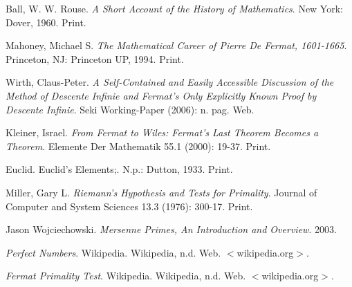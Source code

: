 \documentclass[11pt]{article}
\begin{document}
\begin{thebibliography}{9}
    Ball, W. W. Rouse. \emph{A Short Account of the History of Mathematics}. New York: Dover, 1960. Print.

    Mahoney, Michael S. \emph{The Mathematical Career of Pierre De Fermat, 1601-1665}. Princeton, NJ: Princeton UP, 1994. Print.

    Wirth, Claus-Peter.
    \emph{A Self-Contained and Easily Accessible Discussion of the Method of Descente Infinie and Fermat's Only Explicitly Known Proof by Descente Infinie}.
    Seki Working-Paper (2006): n. pag. Web.

    Kleiner, Israel.
    \emph{From Fermat to Wiles: Fermat's Last Theorem Becomes a Theorem}.
    Elemente Der Mathematik 55.1 (2000): 19-37. Print.

    Euclid. Euclid's Elements;. N.p.: Dutton, 1933. Print.

    Miller, Gary L.
    \emph{Riemann's Hypothesis and Tests for Primality}.
    Journal of Computer and System Sciences 13.3 (1976): 300-17. Print.

    Jason Wojciechowski.
    \emph{Mersenne Primes, An Introduction and Overview}. 2003.


    \emph{Perfect Numbers}. Wikipedia. Wikipedia, n.d. Web. $<$wikipedia.org$>$.



    \emph{Fermat Primality Test}. Wikipedia. Wikipedia, n.d. Web. $<$wikipedia.org$>$.




\end{thebibliography}
\end{document}
